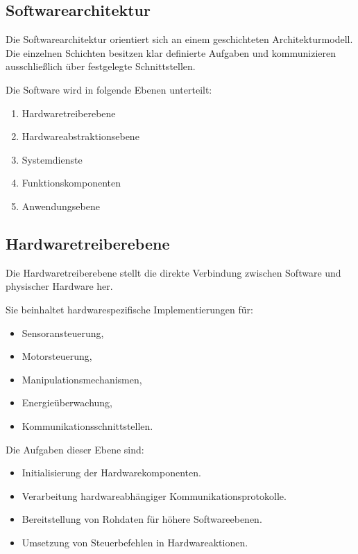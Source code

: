 \subsection{Softwarearchitektur}\label{softwarearchitektur}

Die Softwarearchitektur orientiert sich an einem geschichteten
Architekturmodell. Die einzelnen Schichten besitzen klar definierte
Aufgaben und kommunizieren ausschließlich über festgelegte
Schnittstellen.

Die Software wird in folgende Ebenen unterteilt:

\begin{enumerate}
\def\labelenumi{\arabic{enumi}.}
\tightlist
\item
  Hardwaretreiberebene
\item
  Hardwareabstraktionsebene
\item
  Systemdienste
\item
  Funktionskomponenten
\item
  Anwendungsebene
\end{enumerate}

\subsection{Hardwaretreiberebene}\label{hardwaretreiberebene}

Die Hardwaretreiberebene stellt die direkte Verbindung zwischen Software
und physischer Hardware her.

Sie beinhaltet hardwarespezifische Implementierungen für:

\begin{itemize}
\tightlist
\item
  Sensoransteuerung,
\item
  Motorsteuerung,
\item
  Manipulationsmechanismen,
\item
  Energieüberwachung,
\item
  Kommunikationsschnittstellen.
\end{itemize}

Die Aufgaben dieser Ebene sind:

\begin{itemize}
\tightlist
\item
  Initialisierung der Hardwarekomponenten.
\item
  Verarbeitung hardwareabhängiger Kommunikationsprotokolle.
\item
  Bereitstellung von Rohdaten für höhere Softwareebenen.
\item
  Umsetzung von Steuerbefehlen in Hardwareaktionen.
\end{itemize}


